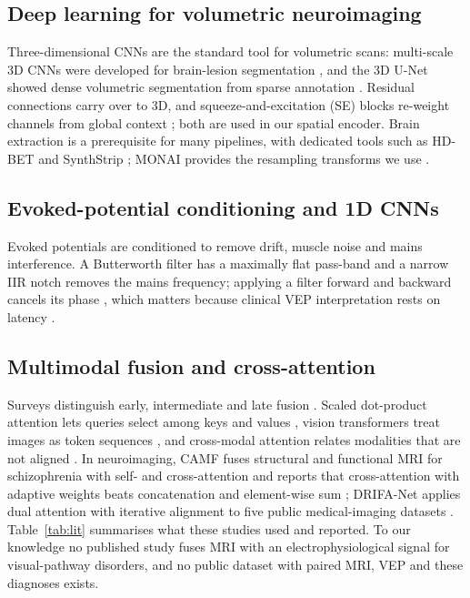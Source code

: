 \subsection{Deep learning for volumetric neuroimaging}
Three-dimensional CNNs are the standard tool for volumetric scans: multi-scale 3D CNNs were developed for brain-lesion segmentation \cite{kamnitsas2017}, and the 3D U-Net showed dense volumetric segmentation from sparse annotation \cite{cicek2016}. Residual connections \cite{he2016} carry over to 3D, and squeeze-and-excitation (SE) blocks re-weight channels from global context \cite{hu2018}; both are used in our spatial encoder. Brain extraction is a prerequisite for many pipelines, with dedicated tools such as HD-BET \cite{isensee2019} and SynthStrip \cite{hoopes2022}; MONAI provides the resampling transforms we use \cite{cardoso2022}.

\subsection{Evoked-potential conditioning and 1D CNNs}
Evoked potentials are conditioned to remove drift, muscle noise and mains interference. A Butterworth filter has a maximally flat pass-band \cite{butterworth1930} and a narrow IIR notch removes the mains frequency; applying a filter forward and backward cancels its phase \cite{gustafsson1996,oppenheim2010}, which matters because clinical VEP interpretation rests on latency \cite{odom2016}.

\subsection{Multimodal fusion and cross-attention}
Surveys distinguish early, intermediate and late fusion \cite{baltrusaitis2019,ramachandram2017}. Scaled dot-product attention lets queries select among keys and values \cite{vaswani2017}, vision transformers treat images as token sequences \cite{dosovitskiy2021}, and cross-modal attention relates modalities that are not aligned \cite{tsai2019,lu2019}. In neuroimaging, CAMF fuses structural and functional MRI for schizophrenia with self- and cross-attention and reports that cross-attention with adaptive weights beats concatenation and element-wise sum \cite{zhou2024camf}; DRIFA-Net applies dual attention with iterative alignment to five public medical-imaging datasets \cite{dhar2025drifa}. Table~\ref{tab:lit} summarises what these studies used and reported. To our knowledge no published study fuses MRI with an electrophysiological signal for visual-pathway disorders, and no public dataset with paired MRI, VEP and these diagnoses exists.

